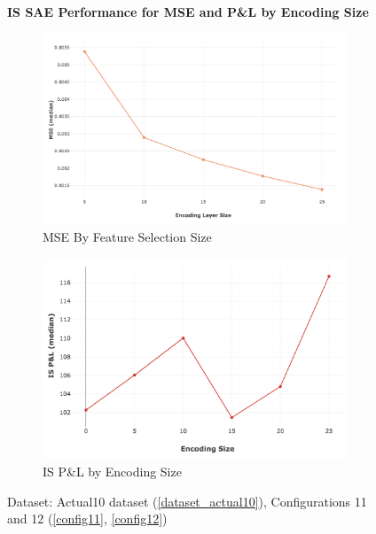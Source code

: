 \documentclass[a4paper,11pt,oneside]{article}
\theoremstyle{plain}
\theoremstyle{definition}
\begin{document}
	\begin{figure}[H]
		\centering
		\textbf{IS SAE Performance for MSE and P\&L by Encoding Size}
		\begin{subfigure}{0.49\linewidth}
			\centering 
			\includegraphics[scale=0.25]{images/results/feature_selection/actual_sae_mse.png}
			\caption[MSE By Feature Selection Size]{MSE By Feature Selection Size}
			\label{figure-actual_sae_mse}
		\end{subfigure}
		\begin{subfigure}{0.49\linewidth}
		\centering 
		\includegraphics[scale=0.26]{images/results/primary/IS_Encoding_PL_median.png} 
		\caption[IS P\&L by Encoding Size]{IS P\&L by Encoding Size}
		\label{figure-IS Encoding_PL_median}
		\end{subfigure}
	\caption[IS SAE Performance for MSE and P\&L by Encoding Size]
	{Dataset: Actual10 dataset (\ref{dataset_actual10}), Configurations 11 and 12 (\ref{config11}, \ref{config12})
}
\end{figure}
\end{document}
